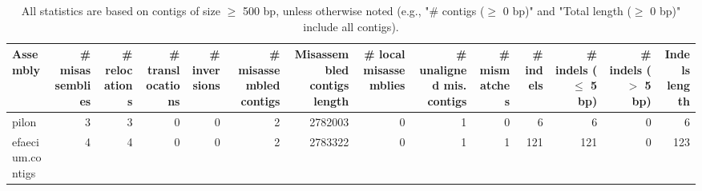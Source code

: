 \documentclass[12pt,a4paper]{article}
\begin{document}
\begin{table}[ht]
\begin{center}
\caption{All statistics are based on contigs of size $\geq$ 500 bp, unless otherwise noted (e.g., "\# contigs ($\geq$ 0 bp)" and "Total length ($\geq$ 0 bp)" include all contigs).}
\begin{tabular}{|l*{13}{|r}|}
\hline
Assembly & \# misassemblies &     \# relocations &     \# translocations &     \# inversions & \# misassembled contigs & Misassembled contigs length & \# local misassemblies & \# unaligned mis. contigs & \# mismatches & \# indels &     \# indels ($\leq$ 5 bp) &     \# indels ($>$ 5 bp) & Indels length \\ \hline
pilon & 3 & 3 & 0 & 0 & 2 & 2782003 & 0 & 1 & 0 & 6 & 6 & 0 & 6 \\ \hline
efaecium.contigs & 4 & 4 & 0 & 0 & 2 & 2783322 & 0 & 1 & 1 & 121 & 121 & 0 & 123 \\ \hline
\end{tabular}
\end{center}
\end{table}
\end{document}
